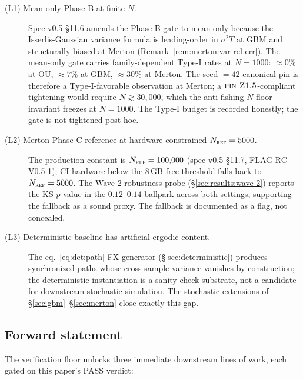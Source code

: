 \documentclass[11pt,letterpaper]{article}
\newcommand{\PinZ}[1]{\textsc{pin Z1.#1}}
\begin{document}
\begin{description}
    \item[(L1) Mean-only Phase B at finite $N$.]
        Spec v0.5 \S11.6 amends the Phase B gate to mean-only because
        the Isserlis-Gaussian variance formula is leading-order in
        $\sigma^{2}T$ at GBM and structurally biased at Merton
        (Remark~\ref{rem:merton:var-rel-err}). The mean-only gate
        carries family-dependent Type-I rates at $N = 1000$:
        $\approx 0\%$ at OU, $\approx 7\%$ at GBM, $\approx 30\%$ at
        Merton. The seed $= 42$ canonical pin is therefore a
        Type-I-favorable observation at Merton; a $\PinZ{5}$-compliant
        tightening would require $N \gtrsim 30{,}000$, which the
        anti-fishing $N$-floor invariant freezes at $N = 1000$. The
        Type-I budget is recorded honestly; the gate is not tightened
        post-hoc.
    \item[(L2) Merton Phase C reference at hardware-constrained
        $N_{\textsc{ref}} = 5000$.]
        The production constant is $N_{\textsc{ref}} = 100{,}000$
        (spec v0.5 \S11.7, FLAG-RC-V0.5-1); CI hardware
        below the 8\,GB-free threshold falls back to
        $N_{\textsc{ref}} = 5000$. The Wave-2 robustness probe
        (\S\ref{sec:results:wave-2}) reports the KS $p$-value in the
        $0.12$--$0.14$ ballpark across both settings, supporting the
        fallback as a sound proxy. The fallback is documented as a
        flag, not concealed.
    \item[(L3) Deterministic baseline has artificial ergodic content.]
        The eq.~\eqref{eq:det:path} FX generator
        (\S\ref{sec:deterministic}) produces synchronized paths whose
        cross-sample variance vanishes by construction; the
        deterministic instantiation is a sanity-check substrate, not
        a candidate for downstream stochastic simulation. The
        stochastic extensions of \S\ref{sec:gbm}--\S\ref{sec:merton}
        close exactly this gap.
\end{description}

\subsection{Forward statement}
\label{sec:discussion:forward}

The verification floor unlocks three immediate downstream lines of work,
each gated on this paper's PASS verdict:
\end{document}
